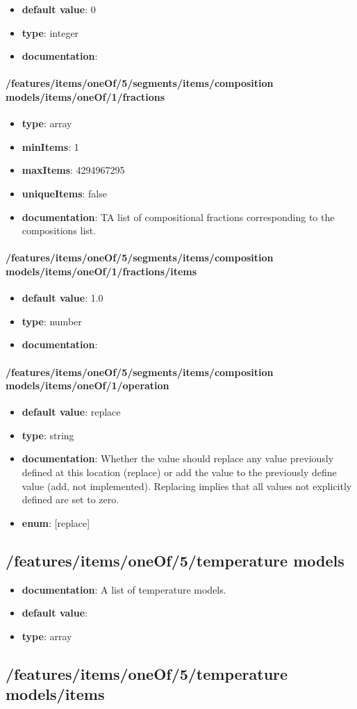 \begin{itemize}\item {\bf default value}: 0
\item {\bf type}: integer
\item {\bf documentation}: 
\end{itemize}\paragraph{/features/items/oneOf/5/segments/items/composition models/items/oneOf/1/fractions}
\begin{itemize}\item {\bf type}: array
\item {\bf minItems}: 1
\item {\bf maxItems}: 4294967295
\item {\bf uniqueItems}: false
\item {\bf documentation}: TA list of compositional fractions corresponding to the compositions list.
\end{itemize}\paragraph{/features/items/oneOf/5/segments/items/composition models/items/oneOf/1/fractions/items}
\begin{itemize}\item {\bf default value}: 1.0
\item {\bf type}: number
\item {\bf documentation}: 
\end{itemize}\paragraph{/features/items/oneOf/5/segments/items/composition models/items/oneOf/1/operation}
\begin{itemize}\item {\bf default value}: replace
\item {\bf type}: string
\item {\bf documentation}: Whether the value should replace any value previously defined at this location (replace) or add the value to the previously define value (add, not implemented). Replacing implies that all values not explicitly defined are set to zero.
\item {\bf enum}: [replace]\end{itemize}\subsection{/features/items/oneOf/5/temperature models}
\begin{itemize}\item {\bf documentation}: A list of temperature models.
\item {\bf default value}: 
\item {\bf type}: array
\end{itemize}\subsection{/features/items/oneOf/5/temperature models/items}

